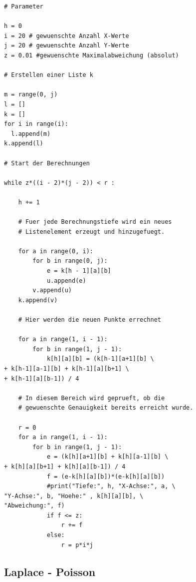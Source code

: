 \documentclass[pdftex,12pt,a4paper]{article}
\begin{document}
\begin{lstlisting}
# Parameter

h = 0
i = 20 # gewuenschte Anzahl X-Werte
j = 20 # gewuenschte Anzahl Y-Werte
z = 0.01 #gewuenschte Maximalabweichung (absolut)

# Erstellen einer Liste k

m = range(0, j)
l = []
k = []
for i in range(i):
  l.append(m)
k.append(l)

# Start der Berechnungen

while z*((i - 2)*(j - 2)) < r :
    
    h += 1

    # Fuer jede Berechnungstiefe wird ein neues
    # Listenelement erzeugt und hinzugefuegt.

    for a in range(0, i):
        for b in range(0, j):
            e = k[h - 1][a][b]
            u.append(e)
        v.append(u)
    k.append(v)

    # Hier werden die neuen Punkte errechnet

    for a in range(1, i - 1):
        for b in range(1, j - 1):
            k[h][a][b] = (k[h-1][a+1][b] \
+ k[h-1][a-1][b] + k[h-1][a][b+1] \
+ k[h-1][a][b-1]) / 4

    # In diesem Bereich wird geprueft, ob die 
    # gewuenschte Genauigkeit bereits erreicht wurde.

    r = 0
    for a in range(1, i - 1):
        for b in range(1, j - 1):
            e = (k[h][a+1][b] + k[h][a-1][b] \
+ k[h][a][b+1] + k[h][a][b-1]) / 4
            f = (e-k[h][a][b])*(e-k[h][a][b])
            #print("Tiefe:", h, "X-Achse:", a, \
"Y-Achse:", b, "Hoehe:" , k[h][a][b], \
"Abweichung:", f)
            if f <= z:
                r += f
            else:
                r = p*i*j
\end{lstlisting}

\subsection {Laplace - Poisson}
\end{document}
